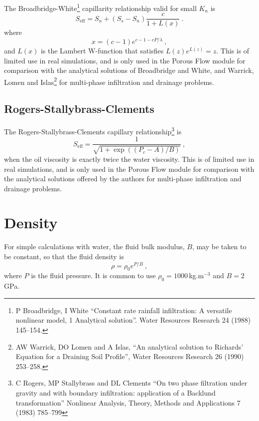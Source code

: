 \documentclass[12pt]{report}
\begin{document}
The Broadbridge-White\footnote{P Broadbridge, I White ``Constant rate rainfall
infiltration: A versatile nonlinear model, 1 Analytical solution''.
Water Resources Research 24 (1988) 145--154.} capillarity relationship
valid for small $K_{n}$ is
\begin{equation}
S_{\mathrm{eff}} = S_{n} + (S_{s} - S_{n}) \frac{c}{1 + L(x)} \ .
\end{equation}
where
\begin{equation}
x = (c - 1) e^{c - 1 - c P/\lambda} \ ,
\end{equation}
and $L(x)$ is the Lambert W-function that satisfies $L(z)e^{L(z)}=z$.
This is of limited use in real simulations, and is only used in the Porous
Flow module for comparison with the analytical solutions of
Broadbridge and White, and Warrick, Lomen and Islas\footnote{AW
  Warrick, DO Lomen and A Islas, ``An analytical solution to Richards'
  Equation for a Draining Soil Profile'', Water Resources Research 26
  (1990) 253--258.} for multi-phase infiltration and drainage
problems.

\subsection{Rogers-Stallybrass-Clements}

The Rogers-Stallybrass-Clements capillary relationship\footnote{C
  Rogers, MP Stallybrass and DL Clements ``On two phase filtration
  under gravity and with boundary infiltration: application of a
  Backlund transformation'' Nonlinear Analysis, Theory, Methods and
  Applications 7 (1983) 785--799} is
\begin{equation}
S_{\mathrm{eff}} = \frac{1}{\sqrt{1 + \exp((P_{c} - A)/B)}} \ ,
\label{eqn.rsc.seff}
\end{equation}
when the oil viscosity is exactly twice the water viscosity.  This is
of limited use in real simulations, and is only used in the Porous
Flow module for comparison with the analytical solutions offered by
the authors for multi-phase infiltration and drainage problems.


\section{Density}

For simple calculations with water, the fluid bulk modulus, $B$, may be
taken to be constant, so that the fluid density is
\begin{equation}
\rho = \rho_{0}e^{P/B} \ ,
\end{equation}
where $P$ is the fluid pressure.  It is common to use $\rho_{0} =
1000$\,kg.m$^{-3}$ and $B = 2$\,GPa.
\end{document}
